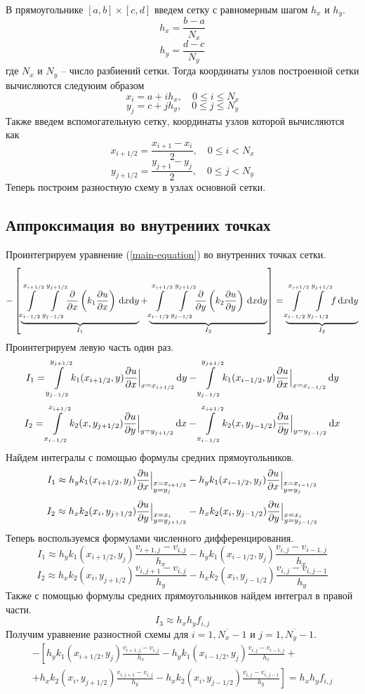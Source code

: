 В прямоугольнике $[a, b] \times [c, d]$ введем сетку с равномерным шагом $h_x$ и $h_y$.
\[ h_x = \frac{b - a}{N_x} \]
\[ h_y = \frac{d - c}{N_y} \]
где $N_x$ и $N_y$ -- число разбиений сетки. Тогда координаты узлов построенной сетки
вычисляются следуюим образом
\[ x_i = a + i h_x,\quad 0 \leq i \leq N_x \]
\[ y_j = c + j h_y,\quad 0 \leq j \leq N_y \]
Также введем вспомогательную сетку, координаты узлов которой вычисляются как
\[ x_{i+1/2} = \frac{x_{i+1} - x_i}{2},\quad 0 \leq i < N_x \]
\[ y_{j+1/2} = \frac{y_{j+1} - y_j}{2},\quad 0 \leq j < N_y \]
Теперь построим разностную схему в узлах основной сетки.

\subsection{Аппроксимация во внутрениих точках}
Проинтегрируем уравнение (\ref{main-equation}) во внутренних точках сетки.
\[
  - \left[
  \underbrace{ \int\limits_{x_{i-1/2}}^{x_{i+1/2}}\int\limits_{y_{j-1/2}}^{y_{j+1/2}} \! \pdv{x}\left( k_1 \pdv{u}{x} \right) \, \dd x \dd y }_{I_1} +
  \underbrace{ \int\limits_{x_{i-1/2}}^{x_{i+1/2}}\int\limits_{y_{j-1/2}}^{y_{j+1/2}} \! \pdv{y}\left( k_2 \pdv{u}{y} \right) \, \dd x \dd y }_{I_2}
  \right] =
  \underbrace{ \int\limits_{x_{i-1/2}}^{x_{i+1/2}}\int\limits_{y_{j-1/2}}^{y_{j+1/2}} \! f \, \dd x \dd y }_{I_3}
\]
Проинтегрируем левую часть один раз.
\[ I_1 = \int\limits_{y_{j-1/2}}^{y_{j+1/2}} \! k_1(x_{i+1/2},y) \pdv{u}{x} \Big\vert_{x = x_{i+1/2}} \, \dd y - \int\limits_{y_{j-1/2}}^{y_{j+1/2}} \! k_1(x_{i-1/2},y) \pdv{u}{x} \Big\vert_{x = x_{i-1/2}} \, \dd y \]
\[ I_2 = \int\limits_{x_{i-1/2}}^{x_{i+1/2}} \! k_2(x,y_{j+1/2}) \pdv{u}{y} \Big\vert_{y = y_{j+1/2}} \, \dd x - \int\limits_{x_{i-1/2}}^{x_{i+1/2}} \! k_2(x,y_{j-1/2}) \pdv{u}{y} \Big\vert_{y = y_{j-1/2}} \, \dd x \]
Найдем интегралы с помощью формулы средних прямоугольников.
\[ I_1 \approx h_y k_1(x_{i+1/2},y_{j}) \pdv{u}{x} \Big\vert_{\begin{subarray}{l} x = x_{i+1/2} \\ y = y_{j} \end{subarray}} - h_y k_1(x_{i-1/2},y_{j}) \pdv{u}{x} \Big\vert_{\begin{subarray}{l} x = x_{i-1/2} \\ y = y_{j} \end{subarray}} \]
\[ I_2 \approx h_x k_2(x_{i},y_{j+1/2}) \pdv{u}{y} \Big\vert_{\begin{subarray}{l} x = x_{i} \\ y = y_{j+1/2} \end{subarray}} - h_x k_2(x_{i},y_{j-1/2}) \pdv{u}{y} \Big\vert_{\begin{subarray}{l} x = x_{i} \\ y = y_{j-1/2} \end{subarray}} \]
Теперь воспользуемся формулами численного дифференцирования.
\[ I_1 \approx h_y k_1(x_{i+1/2},y_{j}) \frac{v_{i+1,j} - v_{i,j}}{h_x} - h_y k_1(x_{i-1/2},y_{j}) \frac{v_{i,j} - v_{i-1,j}}{h_x} \]
\[ I_2 \approx h_x k_2(x_{i},y_{j+1/2}) \frac{v_{i,j+1} - v_{i,j}}{h_y} - h_x k_2(x_{i},y_{j-1/2}) \frac{v_{i,j} - v_{i,j-1}}{h_y} \]
Также с помощью формулы средних прямоугольников найдем интеграл в правой части.
\[ I_3 \approx h_x h_y f_{i,j} \]
Получим уравнение разностной схемы для $i = \overline{1,N_x-1}$ и $j = \overline{1,N_y-1}$.
\begin{multline*}
  - \left[
  h_y k_1(x_{i+1/2},y_{j}) \frac{v_{i+1,j} - v_{i,j}}{h_x} - h_y k_1(x_{i-1/2},y_{j}) \frac{v_{i,j} - v_{i-1,j}}{h_x} + \right. \\
  \left. +
  h_x k_2(x_{i},y_{j+1/2}) \frac{v_{i,j+1} - v_{i,j}}{h_y} - h_x k_2(x_{i},y_{j-1/2}) \frac{v_{i,j} - v_{i,j-1}}{h_y}
  \right] =
  h_x h_y f_{i,j}
\end{multline*}

